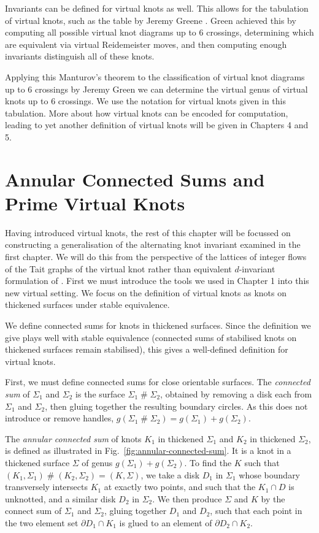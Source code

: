 \documentclass[12pt]{report}
\newcommand{\hash}{\ensuremath{\mathbin{\#}}}
\begin{document}
Invariants can be defined for virtual knots as well. This allows for the tabulation of virtual knots, such as the table by Jeremy Greene \cite{virtual-knot-table}. Green achieved this by computing all possible virtual knot diagrams up to $6$ crossings, determining which are equivalent via virtual Reidemeister moves, and then computing enough invariants distinguish all of these knots. 

Applying this Manturov's theorem to the classification of virtual knot diagrams up to $6$ crossings by Jeremy Green \cite{virtual-knot-table} we can determine the virtual genus of virtual knots up to $6$ crossings. We use the notation for virtual knots given in this tabulation. More about how virtual knots can be encoded for computation, leading to yet another definition of virtual knots will be given in Chapters 4 and 5.


\section{Annular Connected Sums and Prime Virtual Knots}
Having introduced virtual knots, the rest of this chapter will be focussed on constructing a generalisation of the alternating knot invariant examined in the first chapter. We will do this from the perspective of the lattices of integer flows of the Tait graphs of the virtual knot rather than equivalent $d$-invariant formulation of \cite{lattices-graphs-mutation}. First we must introduce the tools we used in Chapter 1 into this new virtual setting. We focus on the definition of virtual knots as knots on thickened surfaces under stable equivalence.

We define connected sums for knots in thickened surfaces. Since the definition we give plays well with stable equivalence (connected sums of stabilised knots on thickened surfaces remain stabilised), this gives a well-defined definition for virtual knots.

First, we must define connected sums for close orientable surfaces. The \textit{connected sum} of $\Sigma_{1}$ and $\Sigma_{2}$ is the surface $\Sigma_{1} \hash \Sigma_{2}$, obtained by removing a disk each from $\Sigma_{1}$ and $\Sigma_{2}$, then gluing together the resulting boundary circles. As this does not introduce or remove handles, $g(\Sigma_{1} \hash \Sigma_{2}) = g(\Sigma_{1}) + g(\Sigma_{2})$.

The \textit{annular connected sum} of knots $K_{1}$ in thickened $\Sigma_{1}$ and $K_{2}$ in thickened $\Sigma_{2}$, is defined as illustrated in Fig.~\ref{fig:annular-connected-sum}. It is a knot in a thickened surface $\Sigma$ of genus $g(\Sigma_{1}) + g(\Sigma_{2})$. To find the $K$ such that $(K_{1}, \Sigma_{1}) \hash (K_{2}, \Sigma_{2}) = (K, \Sigma)$, we take a disk $D_{1}$ in $\Sigma_{1}$ whose boundary transversely intersects $K_{1}$ at exactly two points, and such that the $K_{1} \cap D$ is unknotted, and a similar disk $D_{2}$ in $\Sigma_{2}$. We then produce $\Sigma$ and $K$ by the connect sum of $\Sigma_{1}$ and $\Sigma_{2}$, gluing together $D_{1}$ and $D_{2}$, such that each point in the two element set $\partial D_{1} \cap K_{1}$ is glued to an element of $\partial D_{2} \cap K_{2}$.
\end{document}

